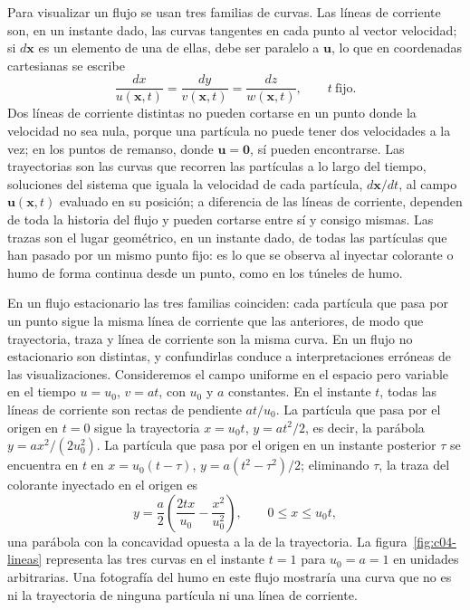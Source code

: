 \documentclass[10pt,openany]{book}
\begin{document}
Para visualizar un flujo se usan tres familias de curvas. Las líneas de corriente son, en un instante dado, las curvas tangentes en cada punto al vector velocidad; si \(d\mathbf{x}\) es un elemento de una de ellas, debe ser paralelo a \(\mathbf{u}\), lo que en coordenadas cartesianas se escribe
\begin{equation}
\frac{dx}{u(\mathbf{x}, t)} = \frac{dy}{v(\mathbf{x}, t)} = \frac{dz}{w(\mathbf{x}, t)}, \qquad t\ \text{fijo}. \label{eq:c04-lineas}
\end{equation}
Dos líneas de corriente distintas no pueden cortarse en un punto donde la velocidad no sea nula, porque una partícula no puede tener dos velocidades a la vez; en los puntos de remanso, donde \(\mathbf{u} = \mathbf{0}\), sí pueden encontrarse. Las trayectorias son las curvas que recorren las partículas a lo largo del tiempo, soluciones del sistema que iguala la velocidad de cada partícula, \(d\mathbf{x}/dt\), al campo \(\mathbf{u}(\mathbf{x}, t)\) evaluado en su posición; a diferencia de las líneas de corriente, dependen de toda la historia del flujo y pueden cortarse entre sí y consigo mismas. Las trazas son el lugar geométrico, en un instante dado, de todas las partículas que han pasado por un mismo punto fijo: es lo que se observa al inyectar colorante o humo de forma continua desde un punto, como en los túneles de humo.

En un flujo estacionario las tres familias coinciden: cada partícula que pasa por un punto sigue la misma línea de corriente que las anteriores, de modo que trayectoria, traza y línea de corriente son la misma curva. En un flujo no estacionario son distintas, y confundirlas conduce a interpretaciones erróneas de las visualizaciones. Consideremos el campo uniforme en el espacio pero variable en el tiempo \(u = u_0\), \(v = at\), con \(u_0\) y \(a\) constantes. En el instante \(t\), todas las líneas de corriente son rectas de pendiente \(at/u_0\). La partícula que pasa por el origen en \(t = 0\) sigue la trayectoria \(x = u_0 t\), \(y = at^{2}/2\), es decir, la parábola \(y = ax^{2}/(2u_0^{2})\). La partícula que pasa por el origen en un instante posterior \(\tau\) se encuentra en \(t\) en \(x = u_0(t - \tau)\), \(y = a(t^{2} - \tau^{2})/2\); eliminando \(\tau\), la traza del colorante inyectado en el origen es
\begin{equation}
y = \frac{a}{2}\left(\frac{2 t x}{u_0} - \frac{x^{2}}{u_0^{2}}\right), \qquad 0 \le x \le u_0 t, \label{eq:c04-traza}
\end{equation}
una parábola con la concavidad opuesta a la de la trayectoria. La figura~\ref{fig:c04-lineas} representa las tres curvas en el instante \(t = 1\) para \(u_0 = a = 1\) en unidades arbitrarias. Una fotografía del humo en este flujo mostraría una curva que no es ni la trayectoria de ninguna partícula ni una línea de corriente.
\end{document}
